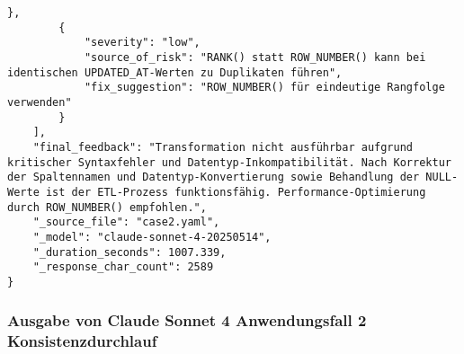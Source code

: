 \begin{lstlisting}[caption={Ausgabe: Claude Sonnet 4 Anwendungsfall 2 Hauptdurchlauf},label={claude_case2_prompt1}]
        },
        {
            "severity": "low",
            "source_of_risk": "RANK() statt ROW_NUMBER() kann bei identischen UPDATED_AT-Werten zu Duplikaten führen",
            "fix_suggestion": "ROW_NUMBER() für eindeutige Rangfolge verwenden"
        }
    ],
    "final_feedback": "Transformation nicht ausführbar aufgrund kritischer Syntaxfehler und Datentyp-Inkompatibilität. Nach Korrektur der Spaltennamen und Datentyp-Konvertierung sowie Behandlung der NULL-Werte ist der ETL-Prozess funktionsfähig. Performance-Optimierung durch ROW_NUMBER() empfohlen.",
    "_source_file": "case2.yaml",
    "_model": "claude-sonnet-4-20250514",
    "_duration_seconds": 1007.339,
    "_response_char_count": 2589
}
\end{lstlisting}

\subsubsection{Ausgabe von Claude Sonnet 4 Anwendungsfall 2 Konsistenzdurchlauf}\label{anhang:subsubsec:claude_case2_prompt2}
